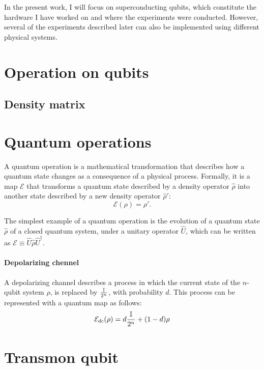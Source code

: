 In the present work, I will focus on superconducting qubits, which constitute the hardware I have worked on and where the experiments were conducted. 
However, several of the experiments described later can also be implemented using different physical systems.

\section{Operation on qubits}

\subsection{Density matrix}
\section{Quantum operations}
A quantum operation is a mathematical transformation that describes how a quantum state changes as a consequence of a physical process. Formally, it is a map $\mathcal{E}$ that transforms a quantum state described by a density operator $\hat{\rho}$ into another state described by a new density operator $\hat{\rho}'$:
\begin{equation}
    \mathcal{E}(\rho) = \rho'\label{eq:quantum_map}.
\end{equation}

The simplest example of a quantum operation is the evolution of a quantum state $\hat{\rho}$ of a closed quantum system, under a unitary operator $\hat{U}$, which can be written as $\mathcal{E} \equiv \hat{U} \hat{\rho} \hat{U}^{\dagger}$.

\paragraph{Depolarizing chennel}
A depolarizing channel describes a process in which the current state of the $n$-qubit system $\rho$, is replaced by $\frac{\mathbb{I}}{2^n}$, with probability $d$. This process can be represented with a quantum map as follows:
\begin{equation}
    \mathcal{E}_{dc}(\rho) = d\frac{\mathbb{I}}{2^n}+(1-d)\rho\label{eq:depolarizing_channel}
\end{equation} 

\section{Transmon qubit}

